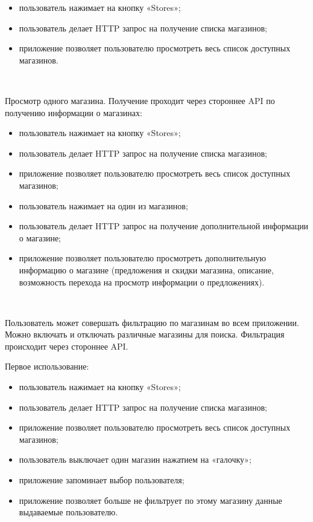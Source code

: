\begin{itemize}
  \item пользователь нажимает на кнопку «Stores»;
  \item пользователь делает HTTP запрос на получение списка магазинов;
  \item приложение позволяет пользователю просмотреть весь список доступных магазинов.
\end{itemize}


~\par

Просмотр одного магазина. Получение проходит через стороннее API по получению информации о магазинах:

\begin{itemize}
  \item пользователь нажимает на кнопку «Stores»;
  \item пользователь делает HTTP запрос на получение списка магазинов;
  \item приложение позволяет пользователю просмотреть весь список доступных магазинов;
  \item пользователь нажимает на один из магазинов;
  \item пользователь делает HTTP запрос на получение дополнительной информации о магазине;
  \item приложение позволяет пользователю просмотреть дополнительную информацию о магазине (предложения и скидки магазина, описание, возможность перехода на просмотр информации о предложениях).
\end{itemize}

~\par

Пользователь может совершать фильтрацию по магазинам во всем приложении. Можно включать и отключать различные магазины для поиска. Фильтрация происходит через стороннее API.

Первое использование:

\begin{itemize}
  \item пользователь нажимает на кнопку «Stores»;
  \item пользователь делает HTTP запрос на получение списка магазинов;
  \item приложение позволяет пользователю просмотреть весь список доступных магазинов;
  \item пользователь выключает один магазин нажатием на «галочку»;
  \item приложение запоминает выбор пользователя;
  \item приложение позволяет больше не фильтрует по этому магазину данные выдаваемые пользователю.
\end{itemize}

